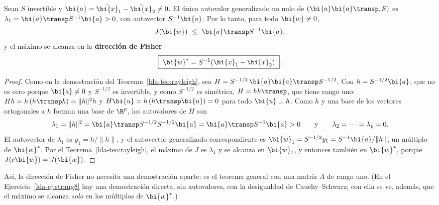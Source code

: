 \begin{corollary}\label{lda-cor:fisher}
Sean $S$ invertible y $\bi{a}=\bar{\bi{x}}_1-\bar{\bi{x}}_2\ne0$. El único autovalor
generalizado no nulo de $(\bi{a}\bi{a}\transp,S)$ es $\lambda_1=\bi{a}\transp S^{-1}\bi{a}>0$,
con autovector $S^{-1}\bi{a}$. Por lo tanto, para todo $\bi{w}\ne0$,
\[
J(\bi{w})\ \le\ \bi{a}\transp S^{-1}\bi{a} ,
\]
y el máximo se alcanza en la \textbf{dirección de Fisher}
\[
\boxed{\ \bi{w}^\ast=S^{-1}(\bar{\bi{x}}_1-\bar{\bi{x}}_2)\ } .
\]
\end{corollary}

\begin{proof}
Como en la demostración del Teorema~\ref{lda-teo:rayleigh}, sea
$H=S^{-1/2}\,\bi{a}\bi{a}\transp S^{-1/2}$. Con $h=S^{-1/2}\bi{a}$, que no es cero porque
$\bi{a}\ne0$ y $S^{-1/2}$ es invertible, y como $S^{-1/2}$ es simétrica,
$H=hh\transp$, que tiene rango uno: $Hh=h\,(h\transp h)=\|h\|^2h$ y
$H\bi{u}=h\,(h\transp \bi{u})=0$ para todo $\bi{u}\perp h$. Como $h$ y una base de los
vectores ortogonales a $h$ forman una base de $\R^p$, los autovalores de $H$
son
\[
\lambda_1=\|h\|^2=\bi{a}\transp S^{-1/2}S^{-1/2}\bi{a}=\bi{a}\transp S^{-1}\bi{a}>0
\qquad\text{y}\qquad \lambda_2=\dots=\lambda_p=0 .
\]
El autovector de $\lambda_1$ es $y_1=h/\|h\|$, y el autovector generalizado
correspondiente es $\bi{w}_1=S^{-1/2}y_1=S^{-1}\bi{a}/\|h\|$, un múltiplo de
$\bi{w}^\ast$. Por el Teorema~\ref{lda-teo:rayleigh}, el máximo de $J$ es
$\lambda_1$ y se alcanza en $\bi{w}_1$, y entonces también en $\bi{w}^\ast$, porque
$J(c\bi{w})=J(\bi{w})$.
\end{proof}

Así, la dirección de Fisher no necesita una demostración aparte: es el
teorema general con una matriz $A$ de rango uno. (En el
Ejercicio~\ref{lda-ej:strang8} hay una demostración directa, sin autovalores,
con la desigualdad de Cauchy--Schwarz; con ella se ve, además, que el máximo
se alcanza \emph{solo} en los múltiplos de $\bi{w}^\ast$.)

